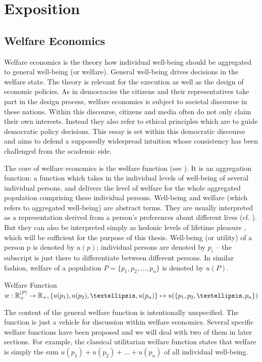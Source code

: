 \chapter{Exposition}
\section{Welfare Economics}

Welfare economics is the theory how individual well-being should be aggregated to general well-being (or welfare). General well-being drives decisions in the welfare state. The theory is relevant for the execution as well as the design of economic policies. As in democracies the citizens and their representatives take part in the design process, welfare economics is subject to societal discourse in these nations. Within this discourse, citizens and media often do not only claim their own interests. Instead they also refer to ethical principles which are to guide democratic policy decisions. This essay is set within this democratic discourse and aims to defend a supposedly widespread intuition whose consistency has been challenged from the academic side.  

The core of welfare economics is the welfare function (see ). It is an aggregation function: a function which takes in the individual levels of well-being of several individual persons, and delivers the level of welfare for the whole aggregated population comprising these individual persons. Well-being and welfare (which refers to aggregated well-being) are abstract terms. They are usually interpreted as a representation derived from a person's preferences about different lives (cf. ). But they can also be interpreted simply as hedonic levels of lifetime pleasure \cite[ch.~4.1]{crisp_2017}, which will be sufficient for the purpose of this thesis. Well-being (or utility) of a person p is denoted by $u(p)$; individual persons are denoted by $p_i$ – the subscript is just there to differentiate between different persons. In similar fashion, welfare of a population $P = \{ p_1, p_2, …, p_n \}$ is denoted by $u(P)$. 

\begin{Definition}{Welfare Function}{}
$
  w: \hfill
  \mathbb{R}_+^{|P|} \to \mathbb{R}_+, \hfill
  \{ u(p_1), u(p_2), …, u(p_n) \} \mapsto u( \{ p_1, p_2, …, p_n \} ) 
$
\end{Definition}

The content of the general welfare function is intentionally unspecified. The function is just a vehicle for discussion within welfare economics. Several specific welfare functions have been proposed and we will deal with two of them in later sections. For example, the classical utilitarian welfare function states that welfare is simply the sum $u(p_1) + u(p_2) + … + u(p_n)$ of all individual well-being.  


